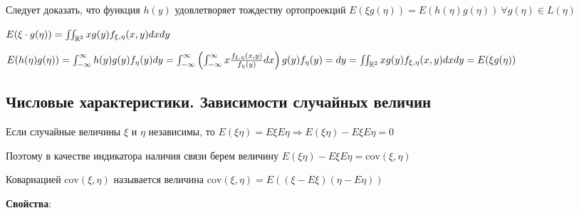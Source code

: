 \documentclass[12pt]{article}
\begin{document}
Следует доказать, что функция $h(y)$ удовлетворяет тождеству ортопроекций $E(\xi g(\eta)) = E(h(\eta)g(\eta)) \ \forall g(\eta) \in L(\eta)$

$E(\xi\cdot g(\eta)) = \iint_{\mathbb{R}^2} xg(y) f_{\xi,\eta}(x, y)dxdy$

$E(h(\eta)g(\eta)) = \int_{-\infty}^{\infty} h(y) g(y) f_{\eta}(y) dy = \int_{-\infty}^\infty \left(\int_{-\infty}^\infty x\frac{f_{\xi,\eta}(x, y)}{f_\eta(y)}dx\right) g(y) f_\eta(y) = dy = \iint_{\mathbb{R}^2} xg(y)f_{\xi,\eta}(x, y)dxdy = E(\xi g(\eta))$

\subsection{Числовые характеристики. Зависимости случайных величин}

\Mem Если случайные величины $\xi$ и $\eta$ независимы, то $E(\xi\eta) = E\xi E\eta \Longrightarrow E(\xi\eta) - E\xi E\eta = 0$

Поэтому в качестве индикатора наличия связи берем величину $E(\xi\eta) - E\xi E\eta = \mathrm{cov}(\xi, \eta)$

\hypertarget{covariance}{}

\Def Ковариацией $\mathrm{cov}(\xi, \eta)$ называется величина $\mathrm{cov}(\xi, \eta) = E((\xi - E\xi)(\eta - E\eta))$

\mediumvspace

\textbf{Свойства}:
\end{document}
